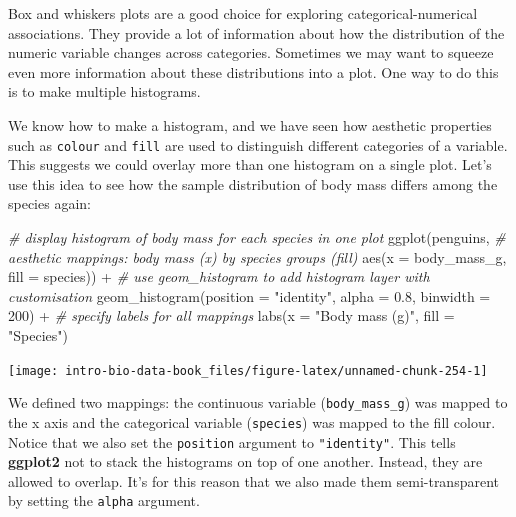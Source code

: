 \documentclass[
]{book}
\newenvironment{Shaded}{\begin{snugshade}}{\end{snugshade}}
\newcommand{\AttributeTok}[1]{\textcolor[rgb]{0.77,0.63,0.00}{#1}}
\newcommand{\CommentTok}[1]{\textcolor[rgb]{0.56,0.35,0.01}{\textit{#1}}}
\newcommand{\DecValTok}[1]{\textcolor[rgb]{0.00,0.00,0.81}{#1}}
\newcommand{\FloatTok}[1]{\textcolor[rgb]{0.00,0.00,0.81}{#1}}
\newcommand{\FunctionTok}[1]{\textcolor[rgb]{0.00,0.00,0.00}{#1}}
\newcommand{\NormalTok}[1]{#1}
\newcommand{\SpecialCharTok}[1]{\textcolor[rgb]{0.00,0.00,0.00}{#1}}
\newcommand{\StringTok}[1]{\textcolor[rgb]{0.31,0.60,0.02}{#1}}
\begin{document}
Box and whiskers plots are a good choice for exploring categorical-numerical associations. They provide a lot of information about how the distribution of the numeric variable changes across categories. Sometimes we may want to squeeze even more information about these distributions into a plot. One way to do this is to make multiple histograms.

We know how to make a histogram, and we have seen how aesthetic properties such as \texttt{colour} and \texttt{fill} are used to distinguish different categories of a variable. This suggests we could overlay more than one histogram on a single plot. Let's use this idea to see how the sample distribution of body mass differs among the species again:

\begin{Shaded}
\begin{Highlighting}[]
\CommentTok{\# display histogram of body mass for each species in one plot}
\FunctionTok{ggplot}\NormalTok{(penguins, }
       \CommentTok{\# aesthetic mappings: body mass (x) by species groups (fill)}
       \FunctionTok{aes}\NormalTok{(}\AttributeTok{x =}\NormalTok{ body\_mass\_g, }\AttributeTok{fill =}\NormalTok{ species))  }\SpecialCharTok{+}
  \CommentTok{\# use geom\_histogram to add histogram layer with customisation}
  \FunctionTok{geom\_histogram}\NormalTok{(}\AttributeTok{position =} \StringTok{"identity"}\NormalTok{, }\AttributeTok{alpha =} \FloatTok{0.8}\NormalTok{, }\AttributeTok{binwidth =} \DecValTok{200}\NormalTok{) }\SpecialCharTok{+} 
  \CommentTok{\# specify labels for all mappings}
  \FunctionTok{labs}\NormalTok{(}\AttributeTok{x =} \StringTok{"Body mass (g)"}\NormalTok{, }\AttributeTok{fill =} \StringTok{"Species"}\NormalTok{)}
\end{Highlighting}
\end{Shaded}

\begin{center}\texttt{[image: intro-bio-data-book\_files/figure-latex/unnamed-chunk-254-1]} \end{center}

We defined two mappings: the continuous variable (\texttt{body\_mass\_g}) was mapped to the x axis and the categorical variable (\texttt{species}) was mapped to the fill colour. Notice that we also set the \texttt{position} argument to \texttt{"identity"}. This tells \textbf{ggplot2} not to stack the histograms on top of one another. Instead, they are allowed to overlap. It's for this reason that we also made them semi-transparent by setting the \texttt{alpha} argument.
\end{document}

